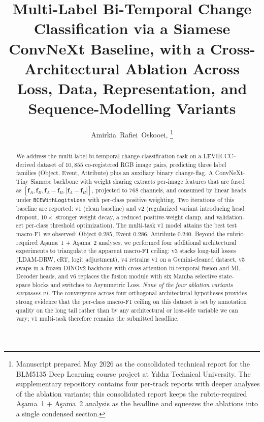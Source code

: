 \documentclass[journal]{IEEEtran}
\begin{document}
\title{Multi-Label Bi-Temporal Change Classification via a Siamese ConvNeXt Baseline, with a Cross-Architectural Ablation Across Loss, Data, Representation, and Sequence-Modelling Variants}

\author{%
  Amirkia~Rafiei~Oskooei,
  \thanks{Manuscript prepared May 2026 as the consolidated technical report for the BLM5135 Deep Learning course project at Y\i ld\i z Technical University. The supplementary repository contains four per-track reports with deeper analyses of the ablation variants; this consolidated report keeps the rubric-required A\c{s}ama~1 + A\c{s}ama~2 analysis as the headline and squeezes the ablations into a single condensed section.}
}


\maketitle

\begin{abstract}
We address the multi-label bi-temporal change-classification task on a LEVIR-CC--derived dataset of $10{,}855$ co-registered RGB image pairs, predicting three label families (Object, Event, Attribute) plus an auxiliary binary change-flag. A ConvNeXt-Tiny Siamese backbone with weight sharing extracts per-image features that are fused as $[\mathbf{f}_A, \mathbf{f}_B, \mathbf{f}_A{-}\mathbf{f}_B, |\mathbf{f}_A{-}\mathbf{f}_B|]$, projected to $768$ channels, and consumed by linear heads under \texttt{BCEWithLogitsLoss} with per-class positive weighting. Two iterations of this baseline are reported: v1 (clean baseline) and v2 (regularized variant introducing head dropout, $10\!\times$ stronger weight decay, a reduced positive-weight clamp, and validation-set per-class threshold optimization). The multi-task v1 model attains the best test macro-F1 we observed: Object $0.285$, Event $0.286$, Attribute $0.240$. Beyond the rubric-required A\c{s}ama~1 + A\c{s}ama~2 analyses, we performed four additional architectural experiments to triangulate the apparent macro-F1 ceiling: v3 stacks long-tail losses (LDAM-DRW, cRT, logit adjustment), v4 retrains v1 on a Gemini-cleaned dataset, v5 swaps in a frozen DINOv2 backbone with cross-attention bi-temporal fusion and ML-Decoder heads, and v6 replaces the fusion module with six Mamba selective state-space blocks and switches to Asymmetric Loss. \emph{None of the four ablation variants surpasses v1.} The convergence across four orthogonal architectural hypotheses provides strong evidence that the per-class macro-F1 ceiling on this dataset is set by annotation quality on the long tail rather than by any architectural or loss-side variable we can vary; v1 multi-task therefore remains the submitted headline.
\end{abstract}
\end{document}
